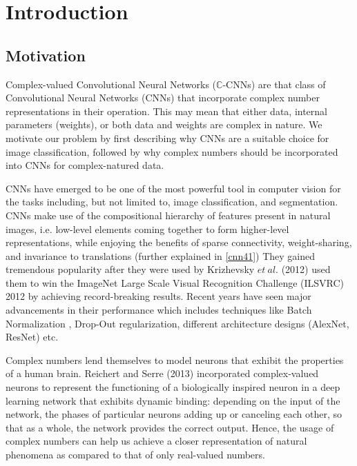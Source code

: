 \chapter{Introduction} \label{chap:intro}

\section{Motivation} \label{sect:thefirst}

Complex-valued Convolutional Neural Networks ($\mathbb{C}$-CNNs) are that class of Convolutional Neural Networks (CNNs) that incorporate complex number representations in their operation. This may mean that either data, internal parameters (weights), or both data and weights are complex in nature. We motivate our problem by first describing why CNNs are a suitable choice for image classification, followed by why complex numbers should be incorporated into CNNs for complex-natured data.

CNNs have emerged to be one of the most powerful tool in computer vision for the tasks including, but not limited to, image classification, and segmentation. CNNs make use of the compositional hierarchy of features present in natural images, i.e. low-level elements coming together to form higher-level representations, while enjoying the benefits of sparse connectivity, weight-sharing, and invariance to translations (further explained in \ref{cnn41})  They gained tremendous popularity after they were used by Krizhevsky $et \ al.$ (2012) \cite{krizhevsky2012imagenet} used them to win the ImageNet Large Scale Visual Recognition Challenge (ILSVRC) 2012 by achieving record-breaking results. Recent years have seen major advancements in their performance which includes techniques like Batch Normalization \cite{bnIoffeS15}, Drop-Out regularization, different architecture designs (AlexNet, ResNet) etc.

Complex numbers lend themselves to model neurons that exhibit the properties of a human brain. Reichert and Serre (2013) \cite{reichert2013neuronal} incorporated complex-valued neurons to represent the functioning of a biologically inspired neuron in a deep learning network that exhibits dynamic binding: depending on the input of the network, the phases of particular neurons adding up or canceling each other, so that as a whole, the network provides the correct output. Hence, the usage of complex numbers can help us achieve a closer representation of natural phenomena as compared to that of only real-valued numbers.

